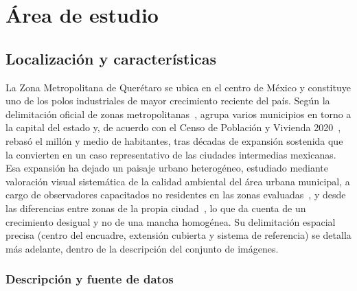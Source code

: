 \section{Área de estudio}
\label{sec:area-estudio}

\subsection{Localización y características}

La Zona Metropolitana de Querétaro se ubica en el centro de México y constituye uno de los polos industriales de mayor crecimiento reciente del país. Según la delimitación oficial de zonas metropolitanas~\parencite{CONAPO2018Delimitacion}, agrupa varios municipios en torno a la capital del estado y, de acuerdo con el Censo de Población y Vivienda 2020~\parencite{INEGI2020Censo}, rebasó el millón y medio de habitantes, tras décadas de expansión sostenida que la convierten en un caso representativo de las ciudades intermedias mexicanas. Esa expansión ha dejado un paisaje urbano heterogéneo, estudiado mediante valoración visual sistemática de la calidad ambiental del área urbana municipal, a cargo de observadores capacitados no residentes en las zonas evaluadas~\parencite{HernandezGuerrero2015}, y desde las diferencias entre zonas de la propia ciudad~\parencite{HernandezGuerreroOsorno2018}, lo que da cuenta de un crecimiento desigual y no de una mancha homogénea. Su delimitación espacial precisa (centro del encuadre, extensión cubierta y sistema de referencia) se detalla más adelante, dentro de la descripción del conjunto de imágenes.

\subsubsection{Descripción y fuente de datos}

